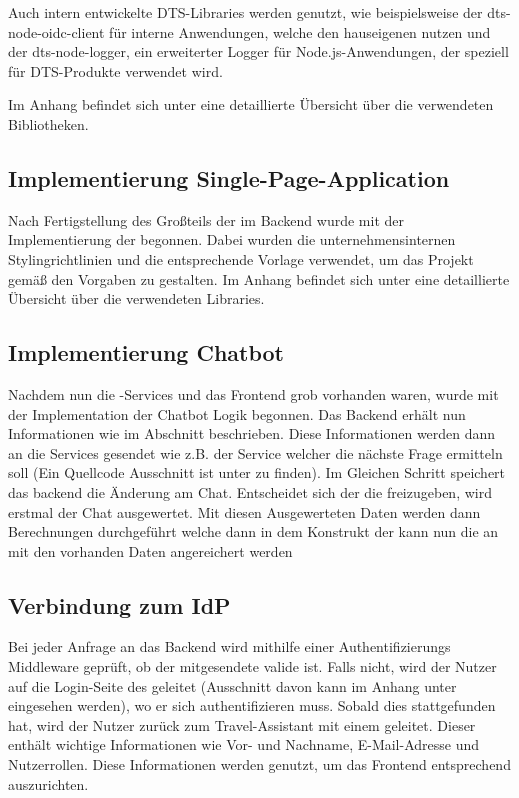 Auch intern entwickelte DTS-Libraries werden genutzt, wie beispielsweise der dts-node-oidc-client für interne Anwendungen, welche den hauseigenen  nutzen und der dts-node-logger, ein erweiterter Logger für Node.js-Anwendungen, der speziell für DTS-Produkte verwendet wird.

Im Anhang befindet sich unter  eine detaillierte Übersicht über die verwendeten Bibliotheken.

\subsection{Implementierung Single-Page-Application}

Nach Fertigstellung des Großteils der  im Backend wurde mit der Implementierung der  begonnen. Dabei wurden die unternehmensinternen Stylingrichtlinien und die entsprechende Vorlage verwendet, um das Projekt gemäß den Vorgaben zu gestalten. Im Anhang befindet sich unter  eine detaillierte Übersicht über die verwendeten Libraries.

\subsection{Implementierung Chatbot}
Nachdem nun die -Services und das Frontend grob vorhanden waren, wurde mit der Implementation der Chatbot Logik begonnen. Das Backend erhält nun Informationen wie im Abschnitt  beschrieben. Diese Informationen werden dann an die Services gesendet wie z.B. der Service welcher die nächste Frage ermitteln soll (Ein Quellcode Ausschnitt ist unter  zu finden).  Im Gleichen Schritt speichert das backend die Änderung am Chat. Entscheidet sich der  die  freizugeben, wird erstmal der Chat ausgewertet. Mit diesen Ausgewerteten Daten werden dann Berechnungen durchgeführt welche dann in dem Konstrukt der  kann nun die  an mit den vorhanden Daten angereichert werden
\subsection{Verbindung zum IdP}

Bei jeder Anfrage an das Backend wird mithilfe einer Authentifizierungs Middleware geprüft, ob der mitgesendete  valide ist. Falls nicht, wird der Nutzer auf die Login-Seite des  geleitet (Ausschnitt davon kann im Anhang unter  eingesehen werden), wo er sich authentifizieren muss. Sobald dies stattgefunden hat, wird der Nutzer zurück zum Travel-Assistant mit einem  geleitet. Dieser  enthält wichtige Informationen wie Vor- und Nachname, E-Mail-Adresse und Nutzerrollen. Diese Informationen werden genutzt, um das Frontend entsprechend auszurichten.

